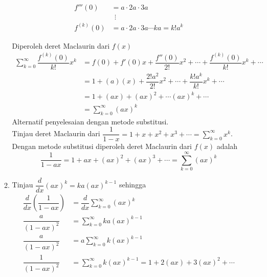 \documentclass{article}
\begin{document}
\begin{enumerate}
\begin{enumerate}
\begin{multicols}{2}
\begin{align*}
		f'''(0) &= a\cdot 2a\cdot 3a\\
		&~~\vdots\\
		f^{(k)}(0) &= a\cdot 2a\cdot 3a\cdots ka=k!a^k
		\end{align*}
		\end{multicols}
		Diperoleh deret Maclaurin dari $f(x)$
		\begin{align*}
		\sum_{k=0}^\infty \dfrac{f^{(k)}(0)}{k!}x^k &= f(0) + f'(0)x +\dfrac{f''(0)}{2!}x^2+\cdots+\dfrac{f^{(k)}(0)}{k!}x^k+\cdots\\
		&= 1+(a)(x)+\dfrac{2!a^2}{2!}x^2+\cdots+\dfrac{k!a^k}{k!}x^k+\cdots\\
		&= 1+(ax)+(ax)^2+\cdots (ax)^k+\cdots\\
		&= \sum_{k=0}^\infty (ax)^k
\end{align*}				 
		Alternatif penyelesaian dengan metode substitusi.\\
		Tinjau deret Maclaurin dari $\displaystyle \dfrac{1}{1-x}=1+x+x^2+x^3+\cdots=\sum_{k=0}^\infty x^k$. Dengan metode substitusi diperoleh deret Maclaurin dari $f(x)$ adalah 
		$$ \dfrac{1}{1-ax}=1+ax+(ax)^2+(ax)^3+\cdots =\sum_{k=0}^\infty (ax)^k$$
		\item Tinjau $\dfrac{d}{dx}(ax)^k=ka(ax)^{k-1}$ sehingga
	\begin{align*}
	\dfrac{d}{dx} \left(\dfrac{1}{1-ax}\right) &= \dfrac{d}{dx} \sum_{k=0}^\infty (ax)^k\\
	\dfrac{a}{(1-ax)^2} &= \sum_{k=0}^\infty ka(ax)^{k-1}\\
	\dfrac{a}{(1-ax)^2} &= a\sum_{k=0}^\infty k(ax)^{k-1}\\
	\dfrac{1}{(1-ax)^2} &= \sum_{k=0}^\infty k(ax)^{k-1} = 1+2(ax)+3(ax)^2+\cdots 
	\end{align*}
	\end{enumerate}
\end{enumerate}
\end{document}
